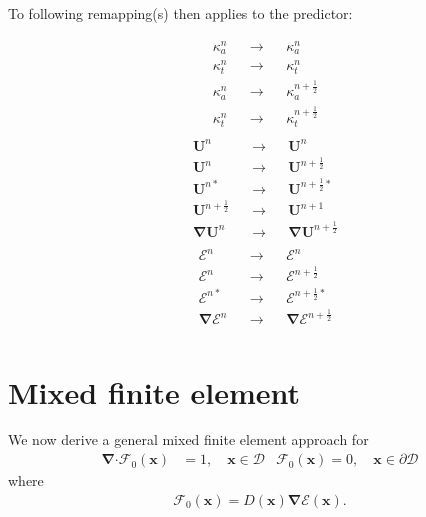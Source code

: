 \documentclass[10pt,letterpaper,notitlepage]{article}
\numberwithin{equation}{section}
\newcommand{\bnabla}{\boldsymbol{\nabla}}
\newcommand{\position}{\mathbf{x}}
\newcommand{\dotp}{\boldsymbol{\cdot}}
\newcommand{\RadE}{\mathcal{E}}
\newcommand{\RadF}{\boldsymbol{\mathcal{F}}}
\newcommand{\HydroU}{\mathbf{U}}
\newcommand{\RadJ}{\RadF_0}
\newcommand{\half}{\frac{1}{2}}
\newcommand{\beq}{\begin{equation*} \begin{aligned}}
\newcommand{\eeq}{\end{aligned}\end{equation*}}
\newcommand{\beqn}{\begin{equation}\begin{aligned}}
\newcommand{\eeqn}{\end{aligned}\end{equation}}
\begin{document}
To following remapping(s) then applies to the predictor:
\begin{multicols}{2}
\beq 
&\kappa_a^n &&\to &&\kappa_a^n \\
&\kappa_t^n &&\to &&\kappa_t^n \\
&\kappa_a^{n} &&\to &&\kappa_a^{n+\half} \\
&\kappa_t^{n} &&\to &&\kappa_t^{n+\half} \\
\eeq
\beq 
&\HydroU^{n}        &&\to &&\HydroU^{n}        \\
&\HydroU^{n}        &&\to &&\HydroU^{n+\half}  \\
&\HydroU^{n*}       &&\to &&\HydroU^{n+\half*} \\
&\HydroU^{n+\half}  &&\to &&\HydroU^{n+1}      \\
&\bnabla \HydroU^{n}        &&\to &&\bnabla \HydroU^{n+\half}  \\
\eeq
\columnbreak
\beq 
&\RadE^{n}        &&\to &&\RadE^{n}        \\
&\RadE^{n}        &&\to &&\RadE^{n+\half}  \\
&\RadE^{n*}       &&\to &&\RadE^{n+\half*} \\
&\bnabla \RadE^{n}        &&\to &&\bnabla \RadE^{n+\half}  \\
\eeq
\end{multicols}
 

\newpage 
\section{Mixed finite element}
We now derive a general mixed finite element approach for 
\begin{subequations} \label{eq:mfem_primary}
\beqn 
\bnabla \dotp \RadJ(\position) &= 1, \quad \position \in \mathcal{D} 
\eeqn 
\beqn 
\RadJ(\position) = 0, \quad \position \in \partial \mathcal{D}
\eeqn 
\end{subequations}
where 
\beqn \label{eq:mfem_f0}
\RadJ(\position) = D(\position) \bnabla \RadE(\position).
\eeqn 
\end{document}
